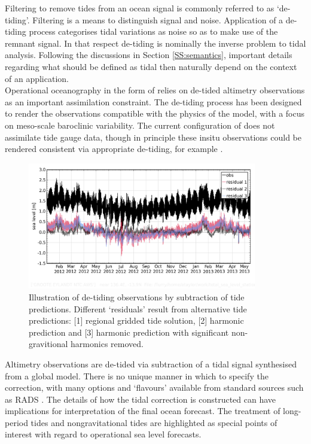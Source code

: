 Filtering to remove tides from an ocean signal is commonly referred to as `de-tiding'.  Filtering is a means to distinguish signal and noise.  Application of a de-tiding process categorises tidal variations as noise so as to make use of the remnant signal.   In that respect de-tiding is nominally the inverse problem to tidal analysis.   Following the discussions in Section \ref{SS:semantics}, important details regarding what should be defined as tidal then naturally depend on the context of an application.\\
Operational oceanography in the form of \BL{} relies on de-tided altimetry observations as an important assimilation constraint.   The de-tiding process has been designed to render the observations compatible with the physics of the model, with a focus on meso-scale baroclinic variability. The current configuration of \BL{} does not assimilate tide gauge data, though in principle these insitu observations could be rendered consistent via appropriate de-tiding, for example \cite{Matsumoto:2000tg}.\\


\begin{figure}[h]
\begin{center}
\includegraphics[width=100mm]{figures/plots/diag_plot_014406_detide_compare_20120101.png}
\caption{Illustration of de-tiding observations by subtraction of tide predictions.  Different `residuals' result from alternative tide predictions: [1] regional gridded tide solution, [2] harmonic prediction and [3] harmonic prediction with significant non-gravitional harmonics removed. }
\end{center}
\end{figure}


Altimetry observations are de-tided via subtraction of a tidal signal synthesised from a global model.  There is no unique manner in which to specify the correction, with many options and `flavours' available from standard sources such as RADS \citep[table 3.2]{Scharroo:2011vd}.  The details of how the tidal correction is constructed can have implications for interpretation of the final ocean forecast.   The treatment of long-period tides \citep{Egbert:2003jd} and nongravitational tides \citep{Arbic:2005gv} are highlighted as special points of interest with regard to operational sea level forecasts.\\




